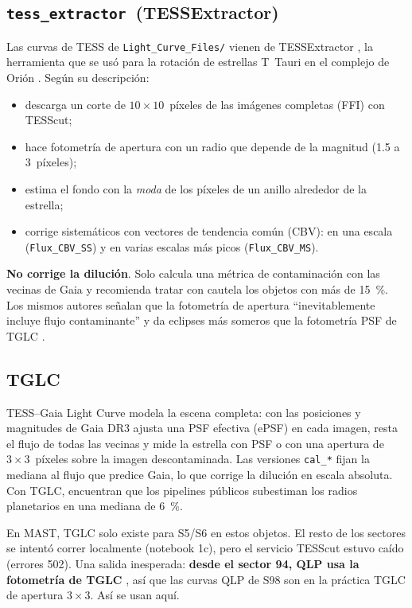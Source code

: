 \documentclass[11pt,a4paper]{article}
\newcommand{\tx}{\texttt{tess\_extractor}}
\begin{document}
\subsection{\tx\ (TESSExtractor)}
Las curvas de TESS \citep{Ricker2015} de \texttt{Light\_Curve\_Files/} vienen de TESSExtractor \citep{Serna2026}, la herramienta
que se usó para la rotación de estrellas T~Tauri en el complejo de Orión \citep{Serna2021}. Según su
descripción:
\begin{itemize}
\item descarga un corte de $10\times10$~píxeles de las imágenes completas (FFI) con TESScut;
\item hace fotometría de apertura con un radio que depende de la magnitud (1.5 a 3~píxeles);
\item estima el fondo con la \emph{moda} de los píxeles de un anillo alrededor de la estrella;
\item corrige sistemáticos con vectores de tendencia común (CBV): en una escala (\texttt{Flux\_CBV\_SS})
  y en varias escalas más picos (\texttt{Flux\_CBV\_MS}).
\end{itemize}
\textbf{No corrige la dilución}. Solo calcula una métrica de contaminación con las vecinas de Gaia y
recomienda tratar con cautela los objetos con más de 15~\%. Los mismos autores señalan que la
fotometría de apertura ``inevitablemente incluye flujo contaminante'' y da eclipses más someros que la
fotometría PSF de TGLC \citep{Serna2026}.

\subsection{TGLC}
TESS--Gaia Light Curve \citep{HanBrandt2023} modela la escena completa: con las posiciones y
magnitudes de Gaia DR3 ajusta una PSF efectiva (ePSF) en cada imagen, resta el flujo de todas las
vecinas y mide la estrella con PSF o con una apertura de $3\times3$~píxeles sobre la imagen
descontaminada. Las versiones \texttt{cal\_*} fijan la mediana al flujo que predice Gaia, lo que
corrige la dilución en escala absoluta. Con TGLC, \citet{Han2025} encuentran que los pipelines públicos
subestiman los radios planetarios en una mediana de 6~\%.

En MAST, TGLC solo existe para S5/S6 en estos objetos. El resto de los sectores se intentó correr
localmente (notebook 1c), pero el servicio TESScut estuvo caído (errores 502). Una salida inesperada:
\textbf{desde el sector 94, QLP usa la fotometría de TGLC} \citep{Petitpas2026}, así que las curvas
QLP de S98 son en la práctica TGLC de apertura $3\times3$. Así se usan aquí.
\end{document}
